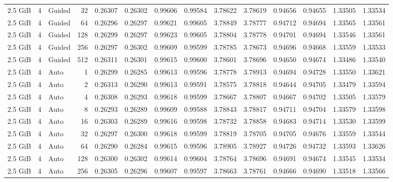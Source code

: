 \begin{table}[H]
\begin{adjustbox}{width=\textwidth, keepaspectratio}
\begin{tabular}{rrlrrrrrrrrrrr}
                    2.5 GiB & 4 & Guided & 32 & 0.26307 & 0.26302 & 0.99606 & 0.99584 & 3.78622 & 3.78619 & 0.94656 & 0.94655 & 1.33505 & 1.33534 \\
                    2.5 GiB & 4 & Guided & 64 & 0.26296 & 0.26297 & 0.99621 & 0.99605 & 3.78849 & 3.78777 & 0.94712 & 0.94694 & 1.33565 & 1.33561 \\
                    2.5 GiB & 4 & Guided & 128 & 0.26299 & 0.26297 & 0.99623 & 0.99605 & 3.78804 & 3.78778 & 0.94701 & 0.94694 & 1.33546 & 1.33561 \\
                    2.5 GiB & 4 & Guided & 256 & 0.26297 & 0.26302 & 0.99609 & 0.99599 & 3.78785 & 3.78673 & 0.94696 & 0.94668 & 1.33559 & 1.33533 \\
                    2.5 GiB & 4 & Guided & 512 & 0.26311 & 0.26301 & 0.99615 & 0.99600 & 3.78601 & 3.78696 & 0.94650 & 0.94674 & 1.33486 & 1.33540 \\
                    2.5 GiB & 4 & Auto & 1 & 0.26299 & 0.26285 & 0.99613 & 0.99596 & 3.78778 & 3.78913 & 0.94694 & 0.94728 & 1.33550 & 1.33621 \\
                    2.5 GiB & 4 & Auto & 2 & 0.26313 & 0.26290 & 0.99613 & 0.99591 & 3.78575 & 3.78818 & 0.94644 & 0.94705 & 1.33479 & 1.33594 \\
                    2.5 GiB & 4 & Auto & 4 & 0.26308 & 0.26293 & 0.99618 & 0.99599 & 3.78667 & 3.78807 & 0.94667 & 0.94702 & 1.33505 & 1.33579 \\
                    2.5 GiB & 4 & Auto & 8 & 0.26293 & 0.26289 & 0.99609 & 0.99588 & 3.78843 & 3.78817 & 0.94711 & 0.94704 & 1.33579 & 1.33598 \\
                    2.5 GiB & 4 & Auto & 16 & 0.26303 & 0.26289 & 0.99616 & 0.99598 & 3.78732 & 3.78858 & 0.94683 & 0.94714 & 1.33530 & 1.33599 \\
                    2.5 GiB & 4 & Auto & 32 & 0.26297 & 0.26300 & 0.99618 & 0.99599 & 3.78819 & 3.78705 & 0.94705 & 0.94676 & 1.33559 & 1.33544 \\
                    2.5 GiB & 4 & Auto & 64 & 0.26290 & 0.26284 & 0.99615 & 0.99596 & 3.78905 & 3.78927 & 0.94726 & 0.94732 & 1.33593 & 1.33626 \\
                    2.5 GiB & 4 & Auto & 128 & 0.26300 & 0.26302 & 0.99614 & 0.99604 & 3.78764 & 3.78696 & 0.94691 & 0.94674 & 1.33545 & 1.33534 \\
                    2.5 GiB & 4 & Auto & 256 & 0.26305 & 0.26296 & 0.99607 & 0.99597 & 3.78663 & 3.78761 & 0.94666 & 0.94690 & 1.33518 & 1.33566 \\

\end{tabular}
\end{adjustbox}
\end{table}

